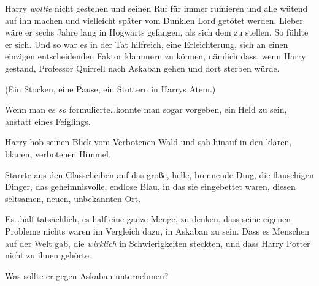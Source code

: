Harry \emph{wollte} nicht gestehen und seinen Ruf für immer ruinieren und alle wütend auf ihn machen und vielleicht später vom Dunklen Lord getötet werden. Lieber wäre er sechs Jahre lang in Hogwarts gefangen, als sich dem zu stellen. So fühlte er sich. Und so war es in der Tat hilfreich, eine Erleichterung, sich an einen einzigen entscheidenden Faktor klammern zu können, nämlich dass, wenn Harry gestand, Professor Quirrell nach Askaban gehen und dort sterben würde.

(Ein Stocken, eine Pause, ein Stottern in Harrys Atem.)

Wenn man es \emph{so} formulierte…konnte man sogar vorgeben, ein Held zu sein, anstatt eines Feiglings.

Harry hob seinen Blick vom Verbotenen Wald und sah hinauf in den klaren, blauen, verbotenen Himmel.

Starrte aus den Glasscheiben auf das große, helle, brennende Ding, die flauschigen Dinger, das geheimnisvolle, endlose Blau, in das sie eingebettet waren, diesen seltsamen, neuen, unbekannten Ort.

Es…half tatsächlich, es half eine ganze Menge, zu denken, dass seine eigenen Probleme nichts waren im Vergleich dazu, in Askaban zu sein. Dass es Menschen auf der Welt gab, die \emph{wirklich} in Schwierigkeiten steckten, und dass Harry Potter nicht zu ihnen gehörte.

Was sollte er gegen Askaban unternehmen?

